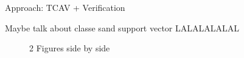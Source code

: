 \documentclass[final]{beamer}
\begin{document}
\begin{frame}[fragile]{}
\begin{textblock}{\colwidth}
\begin{paddedBlock}{Approach: TCAV + Verification}

\alert{Maybe talk about classe sand support vector}
LALALALALAL

\begin{figure}%
    \centering
    \qquad
    \caption{2 Figures side by side}%
    \label{fig:example}%
\end{figure}



\end{paddedBlock}
\end{textblock}
\end{frame}
\end{document}
